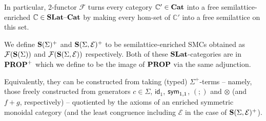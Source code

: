 In particular, 2-functor $\mathcal{F}$ turns every category $\mathbb{C'} \in \mathbf{Cat}$ into a free semilattice-enriched $\mathbb{C} \in \mathbf{SLat}\text{--}\mathbf{Cat}$ by making every hom-set of $\mathbb{C'}$ into a free semilattice on this set.
\begin{definition}
We define $\mathbf{S}(\Sigma)^{+}$ and $\mathbf{S}(\Sigma, \mathcal{E})^{+}$ to be semilattice-enriched SMCs obtained as $\mathcal{F}(\mathbf{S}(\Sigma))$ and $\mathcal{F}(\mathbf{S}(\Sigma, \mathcal{E}))$ respectively.
Both of these $\mathbf{SLat}$-categories are in $\mathbf{PROP}^{+}$ which we define to be the image of $\mathbf{PROP}$ via the same adjunction.
\end{definition}
Equivalently, they can be constructed from taking (typed) $\Sigma^+$-terms  -- namely, those freely constructed from generators $c \in \Sigma$, $\textsf{id}_1$, $\textsf{sym}_{1,1}$, $(;\!)$ and $\otimes$ (and $f+g$, respectively) -- quotiented by the axioms of an enriched symmetric monoidal category (and the least congruence including $\mathcal{E}$ in the case of $\mathbf{S}(\Sigma, \mathcal{E})^{+}$).

